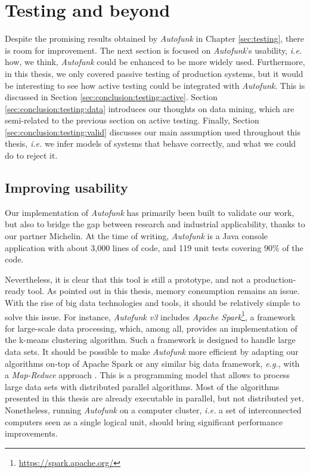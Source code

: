 \section{Testing and beyond}
\label{sec:conclusion:testing}

Despite the promising results obtained by \textit{Autofunk} in
Chapter \ref{sec:testing}, there is room for improvement. The
next section is focused on \textit{Autofunk}'s usability, \emph{i.e.}
how, we think, \textit{Autofunk} could be enhanced to be more
widely used. Furthermore, in this thesis, we only covered passive
testing of production systems, but it would be interesting to see
how active testing could be integrated with \textit{Autofunk}.
This is discussed in Section \ref{sec:conclusion:testing:active}.
Section \ref{sec:conclusion:testing:data} introduces our thoughts
on data mining, which are semi-related to the previous section on
active testing. Finally, Section
\ref{sec:conclusion:testing:valid} discusses our main assumption
used throughout this thesis, \emph{i.e.} we infer models of
systems that behave correctly, and what we could do to reject it.


\subsection{Improving usability}

Our implementation of \textit{Autofunk} has primarily been built
to validate our work, but also to bridge the gap between research
and industrial applicability, thanks to our partner Michelin. At
the time of writing, \emph{Autofunk} is a Java console
application with about 3,000 lines of code, and 119 unit tests
covering 90\% of the code.

Nevertheless, it is clear that this tool is still a prototype,
and not a production-ready tool. As pointed out in this thesis,
memory consumption remains an issue. With the rise of big data
technologies and tools, it should be relatively simple to solve
this issue. For instance, \emph{Autofunk v3} includes
\emph{Apache Spark}\footnote{\url{https://spark.apache.org/}}, a
framework for large-scale data processing, which, among all,
provides an implementation of the k-means clustering algorithm.
Such a framework is designed to handle large data sets. It should
be possible to make \emph{Autofunk} more efficient by adapting
our algorithms on-top of Apache Spark or any similar big data
framework, \emph{e.g.}, with a \emph{Map-Reduce} approach
\cite{dean2008mapreduce}. This is a programming model that allows
to process large data sets with distributed parallel algorithms.
Most of the algorithms presented in this thesis are already
executable in parallel, but not distributed yet. Nonetheless,
running \emph{Autofunk} on a computer cluster, \emph{i.e.} a set
of interconnected computers seen as a single logical unit, should
bring significant performance improvements.

